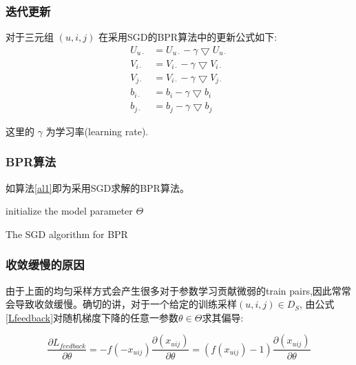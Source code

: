 \subsubsection{迭代更新}
对于三元组  $\left(u,i,j\right)$ 在采用SGD的BPR算法中的更新公式如下:
\begin{align}
	\label{eq10}
U_{u\cdot} &= U_{u\cdot} - \gamma\bigtriangledown U_{u\cdot}\\
V_{i\cdot} &= V_{i\cdot} - \gamma\bigtriangledown V_{i\cdot}\\
V_{j\cdot} &= V_{i\cdot} - \gamma\bigtriangledown V_{j\cdot}\\
b_{i\cdot} &= b_i - \gamma\bigtriangledown b_{i}\\
b_{j\cdot} &= b_j - \gamma\bigtriangledown b_{j}
\end{align}

这里的 $\gamma$ 为学习率(learning rate).

\subsubsection{BPR算法}
如算法\ref{al1}即为采用SGD求解的BPR算法。
\IncMargin{1em}
\begin{algorithm}[ht]
	\SetAlgoNoLine %
	\BlankLine
	
	initialize the model parameter $\Theta$\;
	\caption{The SGD algorithm for BPR}
	\label{al1}%
\end{algorithm}
\DecMargin{1em}

\subsubsection{收敛缓慢的原因}
由于上面的均匀采样方式会产生很多对于参数学习贡献微弱的train pairs,因此常常会导致收敛缓慢。确切的讲，对于一个给定的训练采样$\left(u,i,j\right) \in D_S$, 由公式\ref{Lfeedback}对随机梯度下降的任意一参数$\theta \in \Theta$求其偏导:

\begin{equation}
\label{eq19}
\frac {\partial L_{feedback}} {\partial\theta} 
= -f\left(-x_{uij}\right)\frac{\partial\left(x_{uij}\right)}{\partial\theta}
= \left(f\left(x_{uij}\right)-1\right) \frac{\partial\left(x_{uij}\right)}{\partial\theta}
\end{equation}

